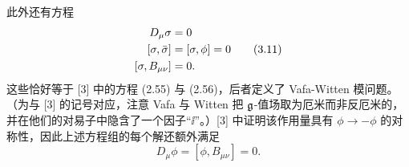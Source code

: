 此外还有方程
\begin{align}
  D_\mu\sigma &= 0 \notag\\
  [\sigma,\bar\sigma] &= [\sigma,\phi]=0 \tag{3.11}\\
  [\sigma,B_{\mu\nu}] &= 0. \notag
\end{align}
这些恰好等于 [3] 中的方程 (2.55) 与 (2.56)，后者定义了 Vafa-Witten 模问题。（为与 [3] 的记号对应，注意 Vafa 与 Witten 把 $\mathfrak{g}$-值场取为厄米而非反厄米的，并在他们的对易子中隐含了一个因子“$\ii$”。）[3] 中证明该作用量具有 $\phi\to-\phi$ 的对称性，因此上述方程组的每个解还额外满足
\[
  D_\mu\phi=[\phi,B_{\mu\nu}]=0.
\]


